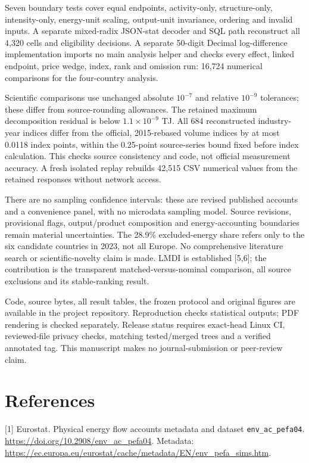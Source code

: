 \documentclass[11pt,letterpaper]{article}
\begin{document}
Seven boundary tests cover equal endpoints, activity-only, structure-only, intensity-only, energy-unit scaling, output-unit invariance, ordering and invalid inputs. A separate mixed-radix JSON-stat decoder and SQL path reconstruct all 4,320 cells and eligibility decisions. A separate 50-digit Decimal log-difference implementation imports no main analysis helper and checks every effect, linked endpoint, price wedge, index, rank and omission run: 16,724 numerical comparisons for the four-country analysis.

Scientific comparisons use unchanged absolute $10^{-7}$ and relative $10^{-9}$ tolerances; these differ from source-rounding allowances. The retained maximum decomposition residual is below $1.1\times10^{-9}$ TJ. All 684 reconstructed industry-year indices differ from the official, 2015-rebased volume indices by at most 0.0118 index points, within the 0.25-point source-series bound fixed before index calculation. This checks source consistency and code, not official measurement accuracy. A fresh isolated replay rebuilds 42,515 CSV numerical values from the retained responses without network access.

There are no sampling confidence intervals: these are revised published accounts and a convenience panel, with no microdata sampling model. Source revisions, provisional flags, output/product composition and energy-accounting boundaries remain material uncertainties. The 28.9\% excluded-energy share refers only to the six candidate countries in 2023, not all Europe. No comprehensive literature search or scientific-novelty claim is made. LMDI is established [5,6]; the contribution is the transparent matched-versus-nominal comparison, all source exclusions and its stable-ranking result.

Code, source bytes, all result tables, the frozen protocol and original figures are available in the project repository. Reproduction checks statistical outputs; PDF rendering is checked separately. Release status requires exact-head Linux CI, reviewed-file privacy checks, matching tested/merged trees and a verified annotated tag. This manuscript makes no journal-submission or peer-review claim.

\section*{References}
\small
[1] Eurostat. Physical energy flow accounts metadata and dataset \texttt{env\_ac\_pefa04}. \url{https://doi.org/10.2908/env_ac_pefa04}. Metadata: \url{https://ec.europa.eu/eurostat/cache/metadata/EN/env_pefa_sims.htm}.
\end{document}
